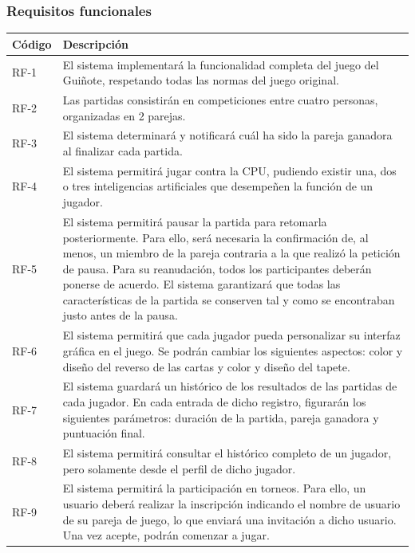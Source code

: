 \documentclass{article}
\begin{document}
\subsubsection{Requisitos funcionales} %
\begin{center}
    \begin{longtable}{ | p{} | p{} | }
        \hline
        \textbf{Código} & \textbf{Descripción} \\
        \hline
        RF-1 & El sistema implementará la funcionalidad completa del juego del Guiñote, respetando todas las normas del juego original. \\
        \hline
        RF-2 & Las partidas consistirán en competiciones entre cuatro personas, organizadas en 2 parejas. \\
        \hline
        RF-3 & El sistema determinará y notificará cuál ha sido la pareja ganadora al finalizar cada partida. \\
        \hline
        RF-4 & El sistema permitirá jugar contra la CPU, pudiendo existir una, dos o tres inteligencias artificiales que desempeñen la función de un jugador. \\
        \hline
        RF-5 & El sistema permitirá pausar la partida para retomarla posteriormente. Para ello, será necesaria la confirmación de, al menos, un miembro de la pareja contraria a la que realizó la petición de pausa.
        Para su reanudación, todos los participantes deberán ponerse de acuerdo. El sistema garantizará que todas las características de la partida se conserven tal y como se encontraban justo antes de la pausa. \\
        \hline
        RF-6 & El sistema permitirá que cada jugador pueda personalizar su interfaz gráfica en el juego. Se podrán cambiar los siguientes aspectos: color y diseño del reverso de las cartas y color y diseño del tapete. \\
        \hline
        RF-7 & El sistema guardará un histórico de los resultados de las partidas de cada jugador. En cada entrada de dicho registro, figurarán los siguientes parámetros: duración de la partida, pareja ganadora y puntuación final. \\
        \hline
        RF-8 & El sistema permitirá consultar el histórico completo de un jugador, pero solamente desde el perfil de dicho jugador. \\
        \hline
        RF-9 & El sistema permitirá la participación en torneos. Para ello, un usuario deberá realizar la inscripción indicando el nombre de usuario de su pareja de juego, lo que enviará una invitación a dicho usuario. Una vez acepte, podrán comenzar a jugar.

\end{longtable}
\end{center}
\end{document}
